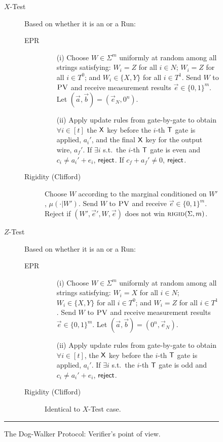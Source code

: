 \documentclass{toc}
\newcommand{\rigid}{\textsc{rigid}}
\newcommand{\pv}{\textsc{PV}}
\begin{document}
\begin{figure}[H]
\begin{description}
\begin{description}
\begin{enumerate}
		\end{enumerate}
	\end{description}
\item[$X$-Test] Based on whether it is
an  or a  Run:
\vspace{-0.07cm}   %
\begin{description}
	\item[EPR] 
	\begin{enumerate}
		\item[(i)] Choose $W\in\Sigma^m$ uniformly at random among all strings satisfying: $W_i=Z$ for all $i\in N$; $W_i=Z$ for all $i\in T^0$; and $W_i\in\{X,Y\}$ for all $i\in T^1$. Send $W$ to $\pv$ and receive measurement results $\vec{e}\in\{0,1\}^m$. Let $(\vec{a},\vec{b})=(\vec{e}_N,0^n)$. 
		\item[(ii)] Apply update rules from  gate-by-gate to obtain $\forall i\in [t]$ the $\sf X$ key before the $i$-th $\sf T$ gate is applied, $a_i'$, and the final $\sf X$ key for the output wire, $a_f'$. 
If $\exists i$ s.t.\ the $i$-th $\sf T$ gate is even and $c_i\neq a_i'+e_i$, $\sf reject$. If $c_f+a_f'\neq 0$, $\sf reject$. 
	\end{enumerate}
\vspace{-0.15cm}  %
	\item[Rigidity (Clifford)] Choose ${W}$ according to the marginal conditioned on ${W}'$, $\mu(\cdot|{W}')$. 
	  Send ${W}$ to $\pv$ and receive $\vec{e}\in\{0,1\}^m$. Reject if   $({W}',\vec{e}',{W},\vec{e})$ does not win $\rigid(\Sigma,m)$. 
\end{description}

\item[$Z$-Test] Based on whether it is
an  or a  Run:
\vspace{-0.07cm}   %
\begin{description}
	\item[EPR] 
	\begin{enumerate}
		\item[(i)] Choose $W\in\Sigma^m$ uniformly at random among all strings satisfying: $W_i=X$ for all $i\in N$; $W_i\in\{X,Y\}$ for all $i\in T^0$; and $W_i=Z$ for all $i\in T^1$. Send $W$ to $\pv$ and receive measurement results $\vec{e}\in\{0,1\}^m$. Let $(\vec{a},\vec{b})=(0^n,\vec{e}_N)$.
		\item[(ii)] Apply update rules from  gate-by-gate to obtain $\forall i\in [t]$, the $\sf X$ key before the $i$-th $\sf T$ gate is applied, $a_i'$. 
If $\exists i$ s.t.\ the $i$-th $\sf T$ gate is odd and $c_i\neq a_i'+e_i$, $\sf reject$. 
	\end{enumerate}
	\item[Rigidity (Clifford)] Identical to $X$-Test case.
\end{description}
\end{description}
\rule[2ex]{\textwidth}{0.5pt}\vspace{-.5cm}
\caption{The Dog-Walker Protocol: Verifier's point of view.}\label{fig:dogwalker-protocol-V}
\end{figure}
\end{document}
